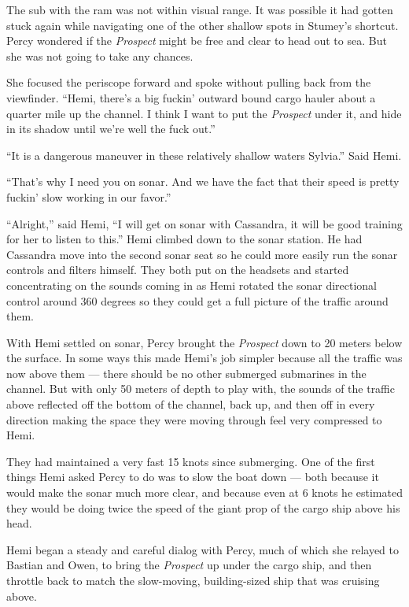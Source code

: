 \documentclass[
]{scrbook}
\begin{document}
The sub with the ram was not within visual range. It was possible it had
gotten stuck again while navigating one of the other shallow spots in
Stumey's shortcut. Percy wondered if the \emph{Prospect} might be free
and clear to head out to sea. But she was not going to take any chances.

She focused the periscope forward and spoke without pulling back from
the viewfinder. ``Hemi, there's a big fuckin' outward bound cargo hauler
about a quarter mile up the channel. I think I want to put the
\emph{Prospect} under it, and hide in its shadow until we're well the
fuck out.''

``It is a dangerous maneuver in these relatively shallow waters
Sylvia.'' Said Hemi.

``That's why I need you on sonar. And we have the fact that their speed
is pretty fuckin' slow working in our favor.''

``Alright,'' said Hemi, ``I will get on sonar with Cassandra, it will be
good training for her to listen to this.'' Hemi climbed down to the
sonar station. He had Cassandra move into the second sonar seat so he
could more easily run the sonar controls and filters himself. They both
put on the headsets and started concentrating on the sounds coming in as
Hemi rotated the sonar directional control around 360 degrees so they
could get a full picture of the traffic around them.

With Hemi settled on sonar, Percy brought the \emph{Prospect} down to 20
meters below the surface. In some ways this made Hemi's job simpler
because all the traffic was now above them --- there should be no other
submerged submarines in the channel. But with only 50 meters of depth to
play with, the sounds of the traffic above reflected off the bottom of
the channel, back up, and then off in every direction making the space
they were moving through feel very compressed to Hemi.

They had maintained a very fast 15 knots since submerging. One of the
first things Hemi asked Percy to do was to slow the boat down --- both
because it would make the sonar much more clear, and because even at 6
knots he estimated they would be doing twice the speed of the giant prop
of the cargo ship above his head.

Hemi began a steady and careful dialog with Percy, much of which she
relayed to Bastian and Owen, to bring the \emph{Prospect} up under the
cargo ship, and then throttle back to match the slow-moving,
building-sized ship that was cruising above.
\end{document}
